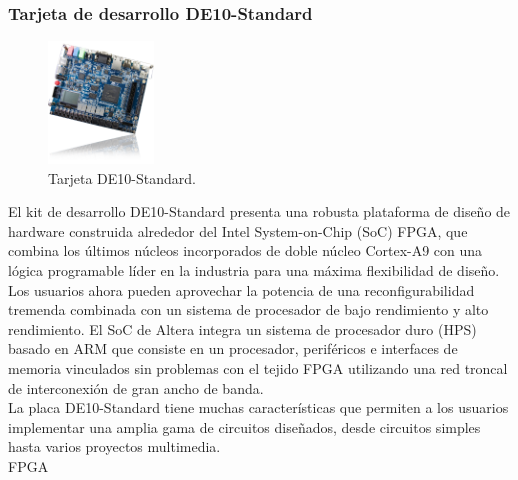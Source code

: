 \documentclass[conference]{IEEEtran}
\begin{document}
\subsubsection*{Tarjeta de desarrollo DE10-Standard}
\begin{figure}[h]
	\centerline{\includegraphics[width=0.25\textwidth]{img/at01.jpg}}
	\caption{Tarjeta DE10-Standard.}
	\label{fig:hw01}
\end{figure}
El kit de desarrollo DE10-Standard presenta una robusta plataforma de diseño de hardware construida alrededor del Intel System-on-Chip (SoC) FPGA, que combina los últimos núcleos incorporados de doble núcleo Cortex-A9 con una lógica programable líder en la industria para una máxima flexibilidad de diseño. Los usuarios ahora pueden aprovechar la potencia de una reconfigurabilidad tremenda combinada con un sistema de procesador de bajo rendimiento y alto rendimiento. El SoC de Altera integra un sistema de procesador duro (HPS) basado en ARM que consiste en un procesador, periféricos e interfaces de memoria vinculados sin problemas con el tejido FPGA utilizando una red troncal de interconexión de gran ancho de banda.\\
La placa DE10-Standard tiene muchas características que permiten a los usuarios implementar una amplia gama de circuitos diseñados, desde circuitos simples hasta varios proyectos multimedia.\\
\textsc{FPGA}
\end{document}

